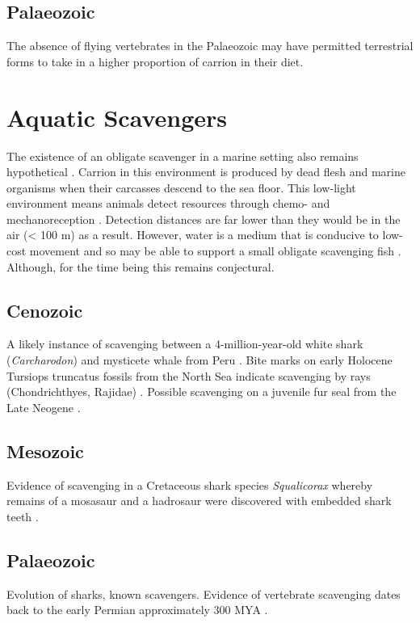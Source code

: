 \documentclass[a4paper,12pt]{article}
\begin{document}
\subsection*{Palaeozoic}
The absence of flying vertebrates in the Palaeozoic may have permitted terrestrial forms to take in a higher proportion of carrion in their diet. 




\section{Aquatic Scavengers}
The existence of an obligate scavenger in a marine setting also remains hypothetical \citep{britton1994marine,smith2003ecology,ruxton2004energetic,ruxton2005searching}. 
Carrion in this environment is produced by dead flesh and marine organisms when their carcasses descend to the sea floor. 
This low-light environment means animals detect resources through chemo- and mechanoreception \citep{ruxton2004energetic}. 
Detection distances are far lower than they would be in the air (< 100 m) as a result. 
However, water is a medium that is conducive to low-cost movement \citep{tucker1975energetic} and so may be able to support a small obligate scavenging fish \citep{ruxton2004energetic,ruxton2005searching}. 
Although, for the time being this remains conjectural.

\subsection*{Cenozoic}
A likely instance of scavenging between a 4-million-year-old white shark (\textit{Carcharodon}) and mysticete whale from Peru \citep{ehret2009caught}.
Bite marks on early Holocene Tursiops truncatus fossils from the North Sea indicate scavenging by rays (Chondrichthyes, Rajidae) \citep{van2009bite}. 
Possible scavenging on a juvenile fur seal from the Late Neogene \citep{boessenecker2011mammalian}. 

\subsection*{Mesozoic}
Evidence of scavenging in a Cretaceous shark species \textit{Squalicorax} whereby remains of a mosasaur and a hadrosaur were discovered with embedded shark teeth \citep{schwimmer1997scavenging}. 
\subsection*{Palaeozoic}
Evolution of sharks, known scavengers. 
Evidence of vertebrate scavenging dates back to the early Permian approximately 300 MYA \citep{reisz2006articulated}.
\end{document}
